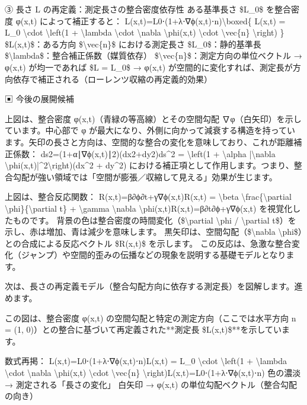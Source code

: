 \documentclass{article}
\begin{document}
③ 長さ L の再定義：測定長さの整合密度依存性
ある基準長さ \$L\_0\$ を整合密度 φ(x,t) によって補正すると：
L(x,t)=L0⋅(1+λ⋅∇ϕ(x,t)⋅n⃗)\textbackslash{}boxed\{ L(x,t) = L\_0 \textbackslash{}cdot \textbackslash{}left(1 + \textbackslash{}lambda \textbackslash{}cdot \textbackslash{}nabla \textbackslash{}phi(x,t) \textbackslash{}cdot \textbackslash{}vec\{n\} \textbackslash{}right) \} 
\$L(x,t)\$：ある方向 \$\textbackslash{}vec\{n\}\$ における測定長さ
\$L\_0\$：静的基準長
\$\textbackslash{}lambda\$：整合補正係数（媒質依存）
\$\textbackslash{}vec\{n\}\$：測定方向の単位ベクトル
→ φ(x,t) が均一であれば \$L = L\_0\$
→ φ(x,t) が空間的に変化すれば、測定長が方向依存で補正される（ローレンツ収縮の再定義的効果）

▣ 今後の展開候補



上図は、整合密度 φ(x,t)（青緑の等高線）とその空間勾配 ∇φ（白矢印）を示しています。中心部で φ が最大になり、外側に向かって減衰する構造を持っています。矢印の長さと方向は、空間的な整合の変化を意味しており、これが距離補正係数：
ds2=(1+α∣∇ϕ(x,t)∣2)(dx2+dy2)ds\textasciicircum{}2 = \textbackslash{}left(1 + \textbackslash{}alpha |\textbackslash{}nabla \textbackslash{}phi(x,t)|\textasciicircum{}2\textbackslash{}right)(dx\textasciicircum{}2 + dy\textasciicircum{}2) 
における補正項として作用します。つまり、整合勾配が強い領域では「空間が膨張／収縮して見える」効果が生じます。


上図は、整合反応関数：
R(x,t)=β∂ϕ∂t+γ∇ϕ(x,t)R(x,t) = \textbackslash{}beta \textbackslash{}frac\{\textbackslash{}partial \textbackslash{}phi\}\{\textbackslash{}partial t\} + \textbackslash{}gamma \textbackslash{}nabla \textbackslash{}phi(x,t)R(x,t)=β∂t∂ϕ​+γ∇ϕ(x,t) 
を視覚化したものです。
背景の色は整合密度の時間変化（\$\textbackslash{}partial \textbackslash{}phi / \textbackslash{}partial t\$）を示し、赤は増加、青は減少を意味します。
黒矢印は、空間勾配（\$\textbackslash{}nabla \textbackslash{}phi\$）との合成による反応ベクトル \$R(x,t)\$ を示します。
この反応は、急激な整合変化（ジャンプ）や空間的歪みの伝播などの現象を説明する基礎モデルとなります。

次は、長さの再定義モデル（整合勾配方向に依存する測定長）を図解します。進めます。 

この図は、整合密度 φ(x,t) の空間勾配と特定の測定方向（ここでは水平方向 n = (1, 0)）との整合に基づいて再定義された**測定長 \$L(x,t)\$**を示しています。

数式再掲：
L(x,t)=L0⋅(1+λ⋅∇ϕ(x,t)⋅n⃗)L(x,t) = L\_0 \textbackslash{}cdot \textbackslash{}left(1 + \textbackslash{}lambda \textbackslash{}cdot \textbackslash{}nabla \textbackslash{}phi(x,t) \textbackslash{}cdot \textbackslash{}vec\{n\} \textbackslash{}right)L(x,t)=L0​⋅(1+λ⋅∇ϕ(x,t)⋅n) 
色の濃淡 → 測定される「長さの変化」
白矢印 → φ(x,t) の単位勾配ベクトル（整合勾配の向き）
\end{document}
